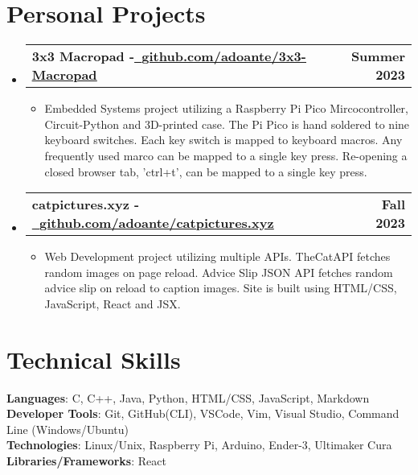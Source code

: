 \documentclass[letterpaper,11pt]{article}
\makeatletter
\newcommand{\resumeItem}[1]{
  \item\small{
    {#1 \vspace{-3pt}}
  }
}
\newcommand{\resumeProjectHeading}[2]{
  \vspace{-3pt}\item
    \begin{tabular*}{1.0\textwidth}[t]{l@{\extracolsep{\fill}}r}
      \textbf{#1} & \textbf{\small #2} \\
    \end{tabular*}\vspace{-7pt}
}
\newcommand{\resumeSubHeadingListStart}{\begin{itemize}[leftmargin=0.0in, label={}]}
\newcommand{\resumeSubHeadingListEnd}{\end{itemize}}
\newcommand{\resumeItemListStart}{\begin{itemize}}
\newcommand{\resumeItemListEnd}{\end{itemize}\vspace{0pt}}
\makeatother
\begin{document}
\section{Personal Projects} 
    \resumeSubHeadingListStart
        \resumeProjectHeading
        {3x3 Macropad -\href{LINK}{\raisebox{-0.2\height}\ \underline{github.com/adoante/3x3-Macropad}}}
        {Summer 2023}
        \resumeItemListStart
            \resumeItem{Embedded Systems project utilizing a Raspberry Pi Pico Mircocontroller, Circuit-Python and 3D-printed case. The Pi Pico is hand soldered to nine keyboard switches. Each key switch is mapped
            to keyboard macros. Any frequently used marco can be mapped to a single key press. Re-opening a closed browser tab, 'ctrl+t', can
            be mapped to a single key press.}
        \resumeItemListEnd
        \resumeProjectHeading
        {catpictures.xyz -\href{LINK}{\raisebox{-0.2\height}\ \underline{github.com/adoante/catpictures.xyz}}}
        {Fall 2023}
        \resumeItemListStart
            \resumeItem{Web Development project utilizing multiple APIs. TheCatAPI fetches random images on page reload. Advice Slip JSON API fetches random advice slip on reload to caption images. Site is built using HTML/CSS, JavaScript, React and JSX.}
        \resumeItemListEnd
        
    \resumeSubHeadingListEnd

\section{Technical Skills}

    \vspace{-7pt}
    \begin{itemize}
    [leftmargin=0.15in, label={}]\small{\item{
        \textbf{Languages}{: C, C++, Java, Python, HTML/CSS, JavaScript, Markdown} \\
        \textbf{Developer Tools}{: Git, GitHub(CLI), VSCode, Vim, Visual Studio, Command Line (Windows/Ubuntu)} \\
        \textbf{Technologies}{: Linux/Unix, Raspberry Pi, Arduino, Ender-3,  Ultimaker Cura} \\
        \textbf{Libraries/Frameworks}{: React} \\
        }}
    \end{itemize}
\end{document}
